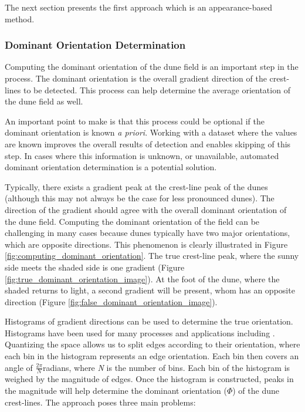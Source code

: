 The next section presents the first approach which is an appearance-based method.



 \subsubsection*{Dominant Orientation Determination} \label{subsec:dominant_orientation}
 
 Computing the dominant orientation of the dune field is an important step in the process. The dominant orientation is the overall gradient direction of the crest-lines to be detected. This process can help determine the average orientation of the dune field as well. 
 
 An important point to make is that this process could be optional if the dominant orientation is known \emph{a priori}. Working with a dataset where the values are known improves the overall results of detection and enables skipping of this step. In cases where this information is unknown, or unavailable, automated dominant orientation determination is a potential solution.
 
 Typically, there exists a gradient peak at the crest-line peak of the dunes (although this may not always be the case for less pronounced dunes). The direction of the gradient should agree with the overall dominant orientation of the dune field. Computing the dominant orientation of the field can be challenging in many cases because dunes typically have two major orientations, which are opposite directions. This phenomenon is clearly illustrated in Figure \ref{fig:computing_dominant_orientation}. The true crest-line peak, where the sunny side meets the shaded side is one gradient (Figure \ref{fig:true_dominant_orientation_image}). At the foot of the dune, where the shaded returns to light, a second gradient will be present, whom has an opposite direction (Figure \ref{fig:false_dominant_orientation_image}).
 
 Histograms of gradient directions can be used to determine the true orientation. Histograms have been used for many processes and applications including \cite{lowe_sift_paper, dalal_histogram_oriented_gradients_human_detection, hu_gradient_field_descriptor}. Quantizing the space allows us to split edges according to their orientation, where each bin in the histogram represents an edge orientation. Each bin then covers an angle of $\frac{2\pi}{N}$radians, where \emph{N} is the number of bins. Each bin of the histogram is weighed by the magnitude of edges. Once the histogram is constructed, peaks in the magnitude will help determine the dominant orientation ($\varPhi$) of the dune crest-lines. The approach poses three main problems:
  

